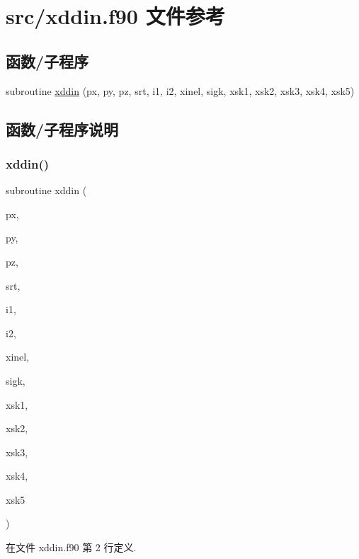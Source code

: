 \hypertarget{xddin_8f90}{}\section{src/xddin.f90 文件参考}
\label{xddin_8f90}
\subsection*{函数/子程序}
\begin{DoxyCompactItemize}
\item 
subroutine \mbox{\hyperlink{xddin_8f90_afac99107af4953638fbc0ad8727771ec}{xddin}} (px, py, pz, srt, i1, i2, xinel, sigk, xsk1, xsk2, xsk3, xsk4, xsk5)
\end{DoxyCompactItemize}


\subsection{函数/子程序说明}
\mbox{\label{xddin_8f90_afac99107af4953638fbc0ad8727771ec}} 
\subsubsection{\texorpdfstring{xddin()}{xddin()}}
{\footnotesize\ttfamily subroutine xddin (\begin{DoxyParamCaption}\item[{}]{px,  }\item[{}]{py,  }\item[{}]{pz,  }\item[{}]{srt,  }\item[{}]{i1,  }\item[{}]{i2,  }\item[{}]{xinel,  }\item[{}]{sigk,  }\item[{}]{xsk1,  }\item[{}]{xsk2,  }\item[{}]{xsk3,  }\item[{}]{xsk4,  }\item[{}]{xsk5 }\end{DoxyParamCaption})}



在文件 xddin.\+f90 第 2 行定义.

